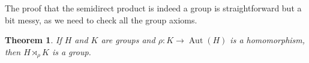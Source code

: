 \documentclass[12pt]{report}
\newtheorem{theorem}{Theorem}[chapter]
\numberwithin{equation}{section}
\numberwithin{theorem}{chapter}
\theoremstyle{definition}
\newtheorem*{basic properties}{Basic Properties}
\newtheorem*{Important Remark}{Important Remark}
\newtheorem{remark}[theorem]{Remark}
\def\sdp{\rtimes}
\DeclareMathOperator{\id}{id}
\DeclareMathOperator{\Aut}{Aut}
\begin{document}
  
 
 	
The proof that the semidirect product is indeed a group is straightforward but a bit messy, as we need to check all the group axioms.


\begin{theorem}\label{semidirect product}
If $H$ and $K$ are groups and $\rho\!: K \to \Aut(H)$ is a homomorphism, then $H \sdp_\rho K$ is a group.
\end{theorem}
\end{document}
